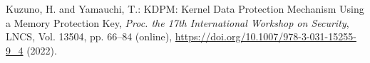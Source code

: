 \documentclass[11pt,a4paper]{article}
\begin{document}



\begin{thebibliography}{99}



  Kuzuno, H. and Yamauchi, T.: KDPM: Kernel Data Protection Mechanism Using a Memory Protection Key,
  \textit{Proc. the 17th International Workshop on Security}, LNCS, Vol. 13504, pp. 66--84 (online),
  \url{https://doi.org/10.1007/978-3-031-15255-9_4} (2022).

  
\end{thebibliography}
\end{document}
